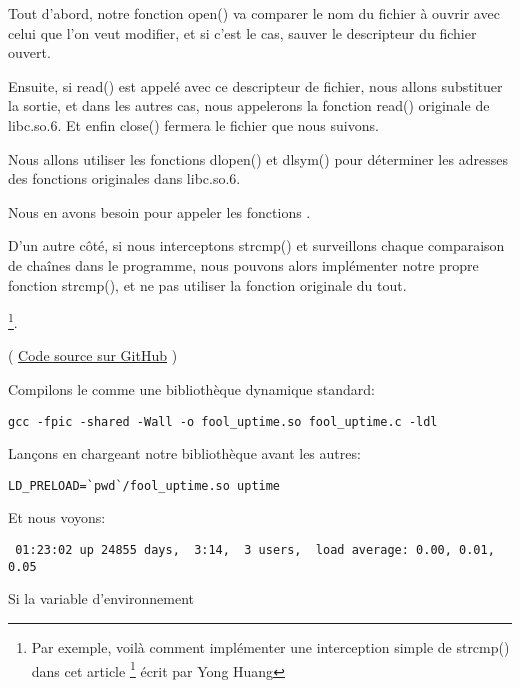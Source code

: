 Tout d'abord, notre fonction open() va comparer le nom du fichier à ouvrir avec celui que l'on veut modifier,
et si c'est le cas, sauver le descripteur du fichier ouvert.

Ensuite, si read() est appelé avec ce descripteur de fichier, nous allons substituer la sortie,
et dans les autres cas, nous appelerons la fonction read() originale de libc.so.6.
Et enfin close() fermera le fichier que nous suivons.


Nous allons utiliser les fonctions dlopen() et dlsym() pour déterminer les adresses des fonctions originales dans libc.so.6.

Nous en avons besoin pour appeler les fonctions .


D'un autre côté, si nous interceptons strcmp() et surveillons chaque comparaison de
chaînes dans le programme, nous pouvons alors implémenter notre propre fonction strcmp(),
et ne pas utiliser la fonction originale du tout.

\footnote{Par exemple, voilà comment implémenter une interception simple de strcmp() dans cet article
\footnote{\href{http://go.yurichev.com/17143}{yurichev.com}}
écrit par Yong Huang}.


( \href{https://github.com/dennis714/RE-for-beginners/blob/master/OS/LD_PRELOAD/fool_uptime.c}{Code source sur GitHub} )

Compilons le comme une bibliothèque dynamique standard:

\begin{lstlisting}
gcc -fpic -shared -Wall -o fool_uptime.so fool_uptime.c -ldl
\end{lstlisting}

Lançons 
en chargeant notre bibliothèque avant les autres:

\begin{lstlisting}
LD_PRELOAD=`pwd`/fool_uptime.so uptime
\end{lstlisting}

Et nous voyons:

\begin{lstlisting}
 01:23:02 up 24855 days,  3:14,  3 users,  load average: 0.00, 0.01, 0.05
\end{lstlisting}

Si la variable d'environnement 


